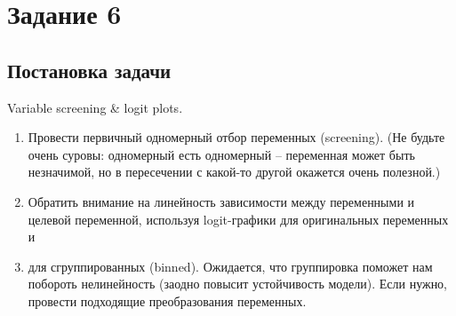 \documentclass[12pt,a4paper]{article}
\begin{document}
\begin{Shaded}
\begin{Highlighting}[]
\OperatorTok{**}
\OperatorTok{=}\NormalTok{ np.zeros(model.children\_.shape[}\NormalTok{])}
\OperatorTok{=} 
   
\OperatorTok{=} 
      \OperatorTok{\textless{}}
\OperatorTok{+=} 
      \NormalTok{:}
\OperatorTok{+=}\NormalTok{ counts[child\_idx }\OperatorTok{{-}}\NormalTok{ n\_samples]}
\OperatorTok{=}

\OperatorTok{=}\NormalTok{)}
\OperatorTok{**}

\NormalTok{)}
\OperatorTok{=}\OperatorTok{=}\NormalTok{)}
\end{Highlighting}
\end{Shaded}

  \newpage
  \section{Задание 6}
  \subsection{Постановка задачи}
  Variable screening \& logit plots.

  \begin{enumerate}
  \item
    Провести первичный одномерный отбор переменных (screening). (Не будьте очень суровы: одномерный
    есть одномерный -- переменная может быть незначимой, но в пересечении
    с какой-то другой окажется очень полезной.)
  \item
    Обратить внимание на линейность зависимости между переменными и
    целевой переменной, используя logit-графики для оригинальных
    переменных и
  \item
    для сгруппированных (binned). Ожидается,
    что группировка поможет нам побороть нелинейность (заодно повысит
    устойчивость модели). Если нужно, провести подходящие преобразования
    переменных.
  \end{enumerate}
\end{document}
